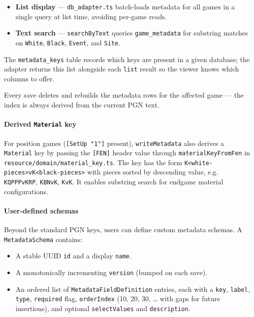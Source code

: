 \documentclass[]{article}
\providecommand{\tightlist}{%
  \setlength{\itemsep}{0pt}\setlength{\parskip}{0pt}}
\let\oldparagraph\paragraph
\renewcommand{\paragraph}[1]{\oldparagraph{#1}\mbox{}}
\begin{document}
\begin{itemize}
\tightlist
\item
  \textbf{List display} --- \texttt{db\_adapter.ts} batch-loads metadata
  for all games in a single query at list time, avoiding per-game reads.
\item
  \textbf{Text search} --- \texttt{searchByText} queries
  \texttt{game\_metadata} for substring matches on \texttt{White},
  \texttt{Black}, \texttt{Event}, and \texttt{Site}.
\end{itemize}

The \texttt{metadata\_keys} table records which keys are present in a
given database; the adapter returns this list alongside each
\texttt{list} result so the viewer knows which columns to offer.

Every save deletes and rebuilds the metadata rows for the affected game
--- the index is always derived from the current PGN text.

\paragraph{\texorpdfstring{Derived \texttt{Material}
key}{Derived Material key}}\label{derived-material-key}

For position games (\texttt{{[}SetUp\ "1"{]}} present),
\texttt{writeMetadata} also derives a \texttt{Material} key by passing
the \texttt{{[}FEN{]}} header value through \texttt{materialKeyFromFen}
in \texttt{resource/domain/material\_key.ts}. The key has the form
\texttt{K\textless{}white-pieces\textgreater{}vK\textless{}black-pieces\textgreater{}}
with pieces sorted by descending value, e.g. \texttt{KQPPPvKRP},
\texttt{KBNvK}, \texttt{KvK}. It enables substring search for endgame
material configurations.

\paragraph{User-defined schemas}\label{user-defined-schemas}

Beyond the standard PGN keys, users can define custom metadata schemas.
A \texttt{MetadataSchema} contains:

\begin{itemize}
\tightlist
\item
  A stable UUID \texttt{id} and a display \texttt{name}.
\item
  A monotonically incrementing \texttt{version} (bumped on each save).
\item
  An ordered list of \texttt{MetadataFieldDefinition} entries, each with
  a \texttt{key}, \texttt{label}, \texttt{type}, \texttt{required} flag,
  \texttt{orderIndex} (10, 20, 30, \ldots{} with gaps for future
  insertions), and optional \texttt{selectValues} and
  \texttt{description}.
\end{itemize}
\end{document}
